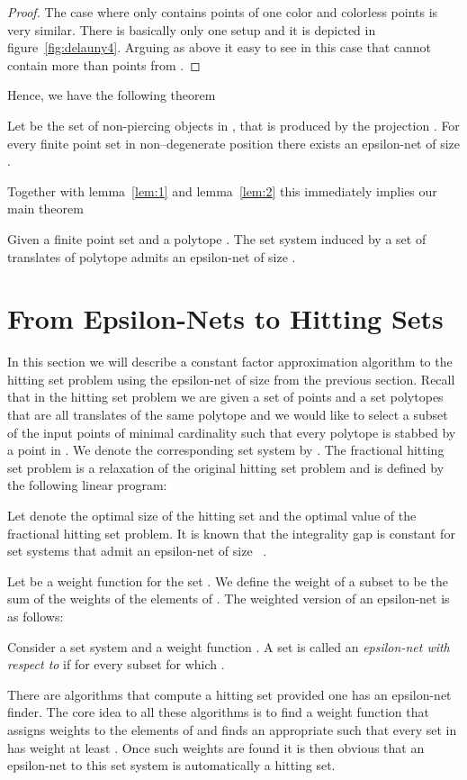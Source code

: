 \documentclass{stacs_proc}
\begin{document}
\begin{proof}
The case where  only contains points of one color and colorless
points is very similar. There is basically only one setup and it is
depicted in figure~\ref{fig:delauny4}. Arguing as above it easy to see
in this case that  cannot contain more than  points
from .  
\end{proof}
Hence, we have the following theorem
\begin{theorem}
  Let  be the set of non-piercing objects in ,
  that is produced by the projection . For every finite point set
  in non--degenerate position there exists an epsilon-net of size 
  . 
\end{theorem}
Together with lemma~\ref{lem:1} and lemma~\ref{lem:2} this
immediately implies our main theorem  
\begin{theorem}
  Given a finite point set  and a polytope . The set
  system  induced by a set of translates of polytope  
  admits an epsilon-net of size . 
\end{theorem}







\vskip-0.3cm
\section{From Epsilon-Nets to Hitting Sets}
In this section we will describe a constant factor approximation
algorithm to the hitting set problem using the epsilon-net of size
 from the previous section. 
Recall that in the hitting set problem we are given a set of points
 and a set polytopes  that are all translates of the same
polytope and we would like to select a subset  of the input
points of minimal cardinality such that every polytope is stabbed by a
point in . We denote the corresponding set system by . 
The fractional hitting set problem is a relaxation of the original
hitting set problem and is defined by the following linear program: 
 

Let  denote the optimal size of the hitting set and  the
optimal value of the fractional hitting set problem. It is known that
the integrality gap is constant for set systems that admit an
epsilon-net of size ~\cite{PA95}.  

Let  be a weight function for the set . We define
the weight  of a subset  to be the sum of the weights of
the elements of . The weighted version of an epsilon-net is as
follows: 
\begin{defi}
  Consider a set system  and a weight function . A set  is called an \emph{epsilon-net with respect to 
    } if  for every subset  for which . 
\end{defi}
There are algorithms that compute a hitting set provided one has an
epsilon-net finder.  
The core idea to all these algorithms is to find a weight function  that assigns weights to the elements of  and finds an
appropriate  such that every set in  has weight at least . Once such weights are found it is then obvious that an
epsilon-net to this set system is automatically a hitting set. 
\end{document}
